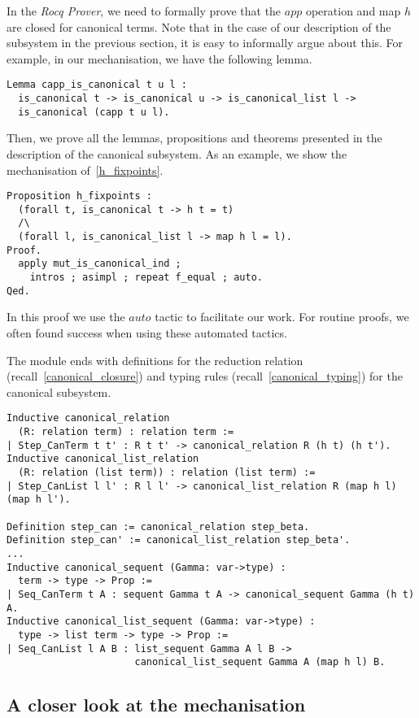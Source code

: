 In the \textit{Rocq Prover}, we need to formally prove that the $app$ operation and map $h$ are closed for canonical terms.
Note that in the case of our description of the subsystem in the previous section, it is easy to informally argue about this.
For example, in our mechanisation, we have the following lemma.
\begin{lstlisting}[language=Coq]
Lemma capp_is_canonical t u l :
  is_canonical t -> is_canonical u -> is_canonical_list l ->
  is_canonical (capp t u l).
\end{lstlisting}

Then, we prove all the lemmas, propositions and theorems presented in the description of the canonical subsystem.
As an example, we show the mechanisation of~\cref{h_fixpoints}.
\begin{lstlisting}[language=Coq]
Proposition h_fixpoints :
  (forall t, is_canonical t -> h t = t)
  /\
  (forall l, is_canonical_list l -> map h l = l).
Proof.
  apply mut_is_canonical_ind ;
    intros ; asimpl ; repeat f_equal ; auto.
Qed.
\end{lstlisting}
In this proof we use the \lst$auto$ tactic to facilitate our work.
For routine proofs, we often found success when using these automated tactics.

The module ends with definitions for the reduction relation (recall~\cref{canonical_closure}) and typing rules (recall~\cref{canonical_typing}) for the canonical subsystem.
\begin{lstlisting}[language=Coq]
Inductive canonical_relation
  (R: relation term) : relation term :=
| Step_CanTerm t t' : R t t' -> canonical_relation R (h t) (h t').
Inductive canonical_list_relation
  (R: relation (list term)) : relation (list term) :=
| Step_CanList l l' : R l l' -> canonical_list_relation R (map h l) (map h l').

Definition step_can := canonical_relation step_beta.
Definition step_can' := canonical_list_relation step_beta'.
...
Inductive canonical_sequent (Gamma: var->type) :
  term -> type -> Prop :=
| Seq_CanTerm t A : sequent Gamma t A -> canonical_sequent Gamma (h t) A.
Inductive canonical_list_sequent (Gamma: var->type) :
  type -> list term -> type -> Prop :=
| Seq_CanList l A B : list_sequent Gamma A l B ->
                      canonical_list_sequent Gamma A (map h l) B.
\end{lstlisting}

\subsection{A closer look at the mechanisation}

